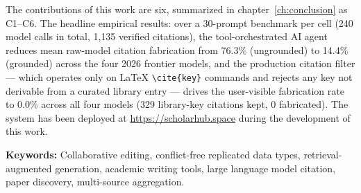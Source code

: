 The contributions of this work are six, summarized in chapter~\ref{ch:conclusion} as C1--C6. The headline empirical results: over a 30-prompt benchmark per cell (240 model calls in total, 1{,}135 verified citations), the tool-orchestrated AI agent reduces mean raw-model citation fabrication from 76.3\% (ungrounded) to 14.4\% (grounded) across the four 2026 frontier models, and the production citation filter --- which operates only on LaTeX \texttt{\textbackslash cite\{key\}} commands and rejects any key not derivable from a curated library entry --- drives the user-visible fabrication rate to 0.0\% across all four models (329 library-key citations kept, 0 fabricated). The system has been deployed at \url{https://scholarhub.space} during the development of this work.

\vspace{0.5cm}
\noindent\textbf{Keywords:} Collaborative editing, conflict-free replicated data types, retrieval-augmented generation, academic writing tools, large language model citation, paper discovery, multi-source aggregation.

\clearpage
